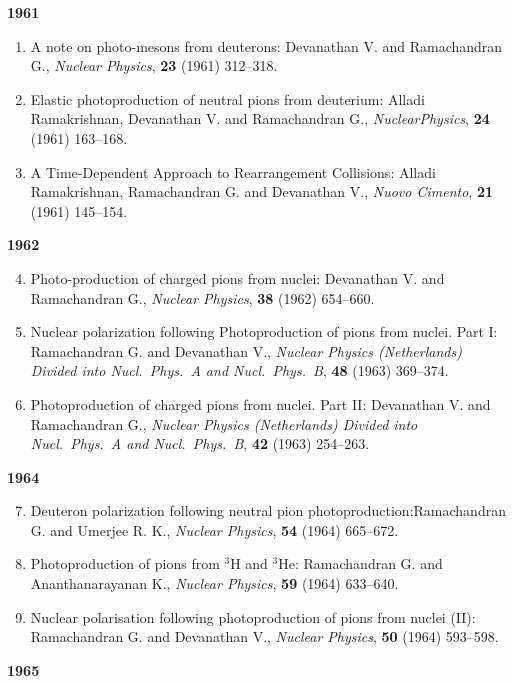 \noindent
\textbf{1961}
\begin{enumerate}
\item A note on photo-mesons from deuterons: Devanathan V. and Ramachandran G., \textit{Nuclear Physics}, {\bf 23} (1961) 312--318.
\item Elastic photoproduction of neutral pions from deuterium: Alladi Ramakrishnan, Devanathan V. and Ramachandran G., \textit{Nuclear\break Physics}, {\bf 24} (1961) 163--168.
\item A Time-Dependent Approach to Rearrangement Collisions: Alladi Ramakrishnan, Ramachandran G. and Devanathan V., \textit{Nuovo Cimento}, {\bf 21} (1961) 145--154.
\end{enumerate}
\noindent
\textbf{1962}
\begin{enumerate}
\setcounter{enumi}{3}
\item Photo-production of charged pions from nuclei: Devanathan V. and Ramachandran G., \textit{Nuclear Physics}, {\bf 38} (1962) 654--660.

\item Nuclear polarization following Photoproduction of pions from nuclei. Part I: Ramachandran G. and Devanathan V., \textit{Nuclear Physics (Netherlands) Divided into Nucl.\ Phys.\ A and Nucl.\ Phys.\ B}, {\bf 48} (1963) 369--374.

\item Photoproduction of charged pions from nuclei. Part II: Devanathan V. and Ramachandran G., \textit{Nuclear Physics (Netherlands) Divided into Nucl.\  Phys.\ A and Nucl.\ Phys.\ B}, {\bf 42} (1963) 254--263.
\end{enumerate}
\noindent
\textbf{1964}
\begin{enumerate}
\setcounter{enumi}{6}
\item Deuteron polarization following neutral pion photoproduction:\break Ramachandran G. and Umerjee R. K., \textit{Nuclear Physics}, {\bf 54} (1964) 665--672.
\item Photoproduction of pions from $^{3}$H and $^{3}$He: Ramachandran G. and Ananthanarayanan K., \textit{Nuclear Physics}, {\bf 59} (1964) 633--640.
\item Nuclear polarisation following photoproduction of pions from nuclei (II): Ramachandran G. and Devanathan V., \textit{Nuclear Physics}, {\bf 50} (1964) 593--598.
\end{enumerate}
\textbf{1965}
